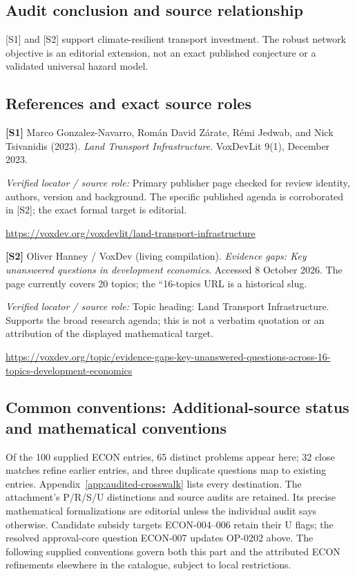 \documentclass[11pt,a4paper]{article}
\begin{document}
\subsection*{Audit conclusion and source relationship}

[S1] and [S2] support climate-resilient transport investment. The robust network objective is an editorial extension, not an exact published conjecture or a validated universal hazard model.

\subsection*{References and exact source roles}

{\footnotesize\raggedright
\par\noindent\textbf{[S1]} Marco Gonzalez-Navarro, Román David Zárate, Rémi Jedwab, and Nick Tsivanidis (2023). \emph{Land Transport Infrastructure}. VoxDevLit 9(1), December 2023.\par \textit{Verified locator / source role:} Primary publisher page checked for review identity, authors, version and background. The specific published agenda is corroborated in [S2]; the exact formal target is editorial.\par \url{https://voxdev.org/voxdevlit/land-transport-infrastructure}\par\smallskip
\par\noindent\textbf{[S2]} Oliver Hanney / VoxDev (living compilation). \emph{Evidence gaps: Key unanswered questions in development economics}. Accessed 8 October 2026. The page currently covers 20 topics; the ``16-topics URL is a historical slug.\par \textit{Verified locator / source role:} Topic heading: Land Transport Infrastructure. Supports the broad research agenda; this is not a verbatim quotation or an attribution of the displayed mathematical target.\par \url{https://voxdev.org/topic/evidence-gaps-key-unanswered-questions-across-16-topics-development-economics}\par\smallskip
}

\subsection*{Common conventions: Additional-source status and mathematical conventions}

\label{audited:conventions}

Of the 100 supplied ECON entries, 65 distinct problems appear here; 32 close
matches refine earlier entries, and three duplicate questions map to existing
entries. Appendix~\ref{app:audited-crosswalk} lists every destination.
The attachment's P/R/S/U distinctions and source audits are retained. Its
precise mathematical formalizations are editorial unless the individual audit
says otherwise. Candidate subsidy targets ECON-004--006 retain their U flags;
the resolved approval-core question ECON-007 updates OP-0202 above.
The following supplied conventions govern both this part and the attributed
ECON refinements elsewhere in the catalogue, subject to local restrictions.
\end{document}
